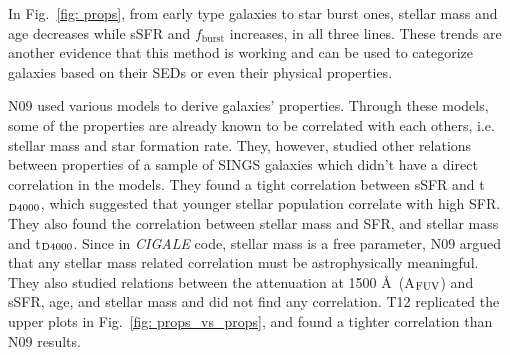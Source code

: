         In Fig.~\ref{fig: props}, from early type galaxies to star burst ones, stellar mass and age decreases while sSFR and $f_\mathrm{burst}$ increases, in all three lines. 
        These trends are another evidence that this method is working and can be used to categorize galaxies based on their SEDs or even their physical properties.
        
    
        N09 used various models to derive galaxies' properties.
        Through these models, some of the properties are already known to be correlated with each others, i.e. stellar mass and star formation rate.
        They, however, studied other relations between properties of a sample of SINGS galaxies which didn't have a direct correlation in the models.
        They found a tight correlation between sSFR and t$_{\rm {D4000}}$, which suggested that younger stellar population correlate with high SFR.
        They also found the correlation between stellar mass and SFR, and stellar mass and t$_{\rm {D4000}}$.
        Since in {\em CIGALE} code, stellar mass is a free parameter, N09 argued that any stellar mass related correlation must be astrophysically meaningful. 
        They also studied relations between the attenuation at 1500 \AA~(A$_{\rm {FUV}}$) and sSFR, age, and stellar mass and did not find any correlation.
        T12 replicated the upper plots in Fig.~\ref{fig: props_vs_props}, and found a tighter correlation than N09 results. 
        
